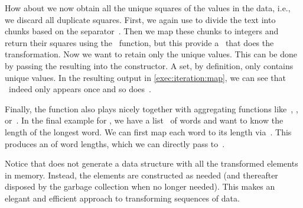 How about we now obtain all the unique squares of the values in the  data, i.e., we discard all duplicate squares.
First, we again use  to divide the text into chunks based on the separator~\pythonil{\",\"}.
Then we map these chunks to integers and return their squares using the ~function, but this provide a~ that does the transformation.
Now we want to retain only the unique values.
This can be done by passing the resulting  into the  constructor.
A set, by definition, only contains unique values.
In the resulting output in \cref{exec:iteration:map}, we can see that ~indeed only appears once and so does~.

Finally, the  function also plays nicely together with aggregating functions like~, , or~.
In the final example for , we have a list~ of words and want to know the length of the longest word.
We can first map each word to its length via~.
This produces an  of word lengths, which we can directly pass to~.

Notice that  does not generate a data structure with all the transformed elements in memory.
Instead, the elements are constructed as needed (and thereafter disposed by the garbage collection when no longer needed).
This makes  an elegant and efficient approach to transforming sequences of data.

